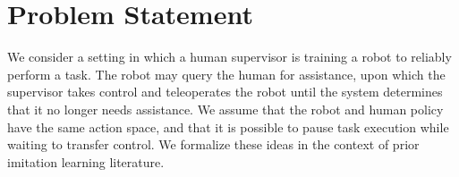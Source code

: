 \section{Problem Statement}
\label{sec:prob-statement}
We consider a setting in which a human supervisor is training a robot to reliably perform a task. The robot may query the human for assistance, upon which the supervisor takes control and teleoperates the robot until the system determines that it no longer needs assistance. We assume that the robot and human policy have the same action space, and that it is possible to pause task execution while waiting to transfer control. We formalize these ideas in the context of prior imitation learning literature.

